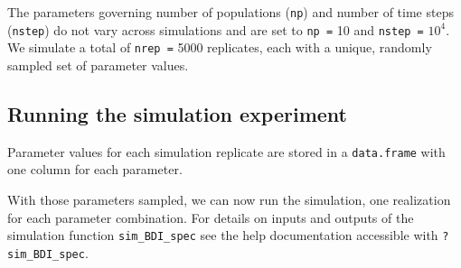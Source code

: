 \documentclass[
  letterpaper,
  DIV=11,
  numbers=noendperiod]{scrartcl}
\newenvironment{Shaded}{\begin{snugshade}}{\end{snugshade}}
\newcommand{\AttributeTok}[1]{\textcolor[rgb]{0.40,0.45,0.13}{#1}}
\newcommand{\CommentTok}[1]{\textcolor[rgb]{0.37,0.37,0.37}{#1}}
\newcommand{\ControlFlowTok}[1]{\textcolor[rgb]{0.00,0.23,0.31}{\textbf{#1}}}
\newcommand{\DecValTok}[1]{\textcolor[rgb]{0.68,0.00,0.00}{#1}}
\newcommand{\FunctionTok}[1]{\textcolor[rgb]{0.28,0.35,0.67}{#1}}
\newcommand{\NormalTok}[1]{\textcolor[rgb]{0.00,0.23,0.31}{#1}}
\newcommand{\OtherTok}[1]{\textcolor[rgb]{0.00,0.23,0.31}{#1}}
\newcommand{\SpecialCharTok}[1]{\textcolor[rgb]{0.37,0.37,0.37}{#1}}
\newcommand{\StringTok}[1]{\textcolor[rgb]{0.13,0.47,0.30}{#1}}
\begin{document}
The parameters governing number of populations (\texttt{np}) and number
of time steps (\texttt{nstep}) do not vary across simulations and are
set to \texttt{np\ =} 10 and \texttt{nstep\ =} \ensuremath{10^{4}}. We
simulate a total of \texttt{nrep\ =} 5000 replicates, each with a
unique, randomly sampled set of parameter values.

\subsection{Running the simulation
experiment}\label{running-the-simulation-experiment}

Parameter values for each simulation replicate are stored in a
\texttt{data.frame} with one column for each parameter.

\begin{Shaded}
\end{Shaded}

With those parameters sampled, we can now run the simulation, one
realization for each parameter combination. For details on inputs and
outputs of the simulation function \texttt{sim\_BDI\_spec} see the help
documentation accessible with \texttt{?sim\_BDI\_spec}.

\begin{Shaded}
\end{Shaded}
\end{document}
